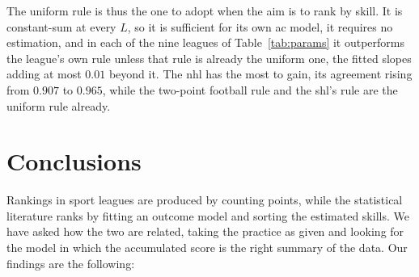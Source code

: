 \documentclass[letterpaper,12pt]{article}
\begin{document}
The uniform rule is thus the one to adopt when the aim is to rank by skill. It is constant-sum at every $L$, so it is
sufficient for its own \gls{ac} model, it requires no estimation, and in each of the nine
leagues of Table~\ref{tab:params} it outperforms the league's own rule unless that rule is
already the uniform one, the fitted slopes adding at most $0.01$ beyond it. The \gls{nhl} has the most to gain,
its agreement rising from $0.907$ to $0.965$, while the two-point football rule and the
\gls{shl}'s rule are the uniform rule already.

\section{Conclusions}\label{Sec:Conclusions}

Rankings in sport leagues are produced by counting points, while the statistical literature ranks by fitting an outcome model and sorting the estimated skills. We have asked how the two are related, taking the practice as given and looking for the model in which the accumulated score is the right summary of the data. Our findings are the following:
\end{document}
